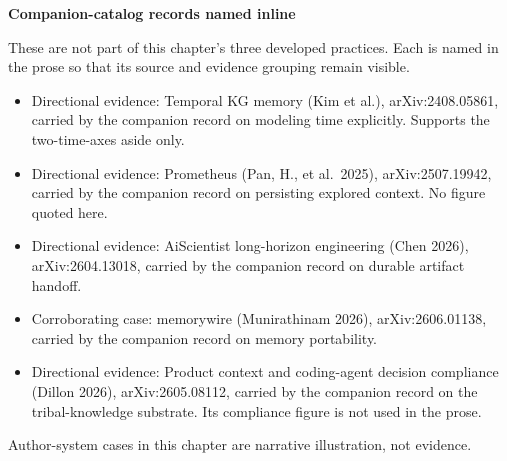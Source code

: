 \textbf{Companion-catalog records named inline}

These are not part of this chapter's three developed practices. Each is named in the prose so that its source and evidence grouping remain visible.

\begin{itemize}
\tightlist
\item
  Directional evidence: Temporal KG memory (Kim et al.), arXiv:2408.05861, carried by the companion record on modeling time explicitly. Supports the two-time-axes aside only.
\item
  Directional evidence: Prometheus (Pan, H., et al.~2025), arXiv:2507.19942, carried by the companion record on persisting explored context. No figure quoted here.
\item
  Directional evidence: AiScientist long-horizon engineering (Chen 2026), arXiv:2604.13018, carried by the companion record on durable artifact handoff.
\item
  Corroborating case: memorywire (Munirathinam 2026), arXiv:2606.01138, carried by the companion record on memory portability.
\item
  Directional evidence: Product context and coding-agent decision compliance (Dillon 2026), arXiv:2605.08112, carried by the companion record on the tribal-knowledge substrate. Its compliance figure is not used in the prose.
\end{itemize}

Author-system cases in this chapter are narrative illustration, not evidence.

